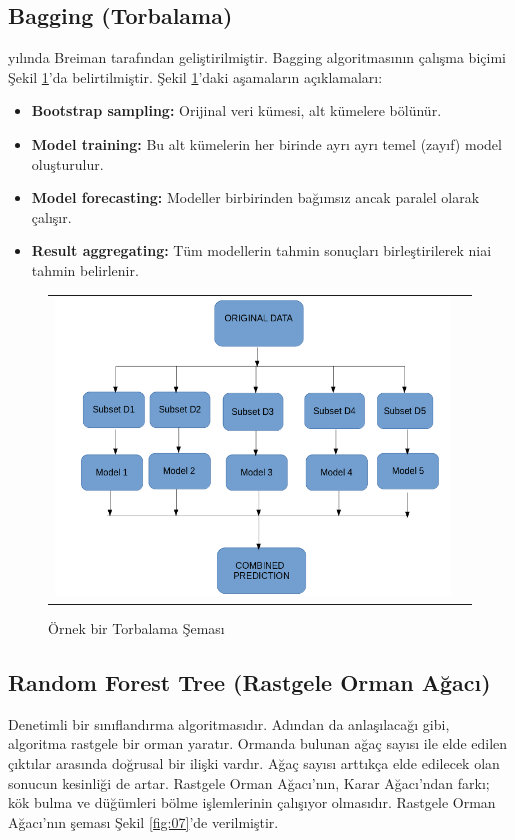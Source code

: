 \documentclass[conference]{IEEEtran}
\begin{document}
\subsection{\textbf{Bagging (Torbalama)}}
 yılında Breiman tarafından geliştirilmiştir. Bagging algoritmasının çalışma biçimi Şekil \ref{fig:06}'da belirtilmiştir. Şekil \ref{fig:06}'daki aşamaların açıklamaları\cite{18}:

\begin{itemize}
\item \textbf{Bootstrap sampling:} Orijinal veri kümesi, alt kümelere bölünür.
\item \textbf{Model training:} Bu alt kümelerin her birinde ayrı ayrı temel (zayıf) model oluşturulur.
\item \textbf{Model forecasting:} Modeller birbirinden bağımsız ancak paralel olarak çalışır.
\item \textbf{Result aggregating:} Tüm modellerin tahmin sonuçları birleştirilerek niai tahmin belirlenir.
\end{itemize}

\begin{figure}[!h]
	\centering%
	\begin{center}
		\begin{tabular}{cc}%
			\includegraphics[scale=0.35]{pictures/pic_06.png}&%
		\end{tabular}%
	\end{center}
	\caption{Örnek bir Torbalama Şeması\cite{18}}%
	\label{fig:06}
\end{figure}
\newpage
\subsection{\textbf{Random Forest Tree (Rastgele Orman Ağacı)}}
\quad Denetimli bir sınıflandırma algoritmasıdır. Adından da anlaşılacağı gibi, algoritma rastgele bir orman yaratır. Ormanda bulunan ağaç sayısı ile elde edilen çıktılar arasında doğrusal bir ilişki vardır. Ağaç sayısı arttıkça elde edilecek olan sonucun kesinliği de artar. Rastgele Orman Ağacı’nın, Karar Ağacı’ndan farkı; kök bulma ve düğümleri bölme işlemlerinin çalışıyor olmasıdır\cite{19}. Rastgele Orman Ağacı’nın şeması Şekil \ref{fig:07}'de verilmiştir.
\end{document}
